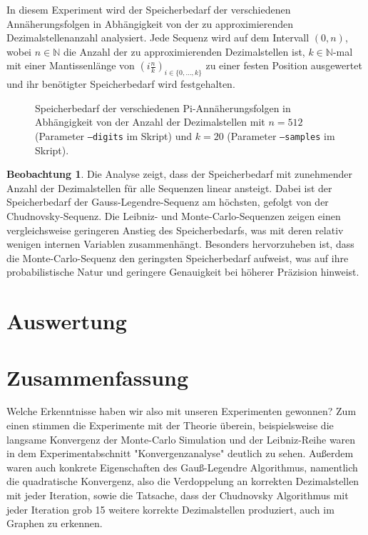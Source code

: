 \documentclass{scrartcl}
\theoremstyle{definition}
\newtheorem{approximation sequence}{Annäherungsfolge}
\newtheorem{observation}{Beobachtung}
\begin{document}
In diesem Experiment wird der Speicherbedarf der verschiedenen
Annäherungsfolgen in Abhängigkeit von der zu approximierenden
Dezimalstellenanzahl analysiert. Jede Sequenz wird auf dem Intervall \((0,
n)\), wobei \(n \in \mathbb{N}\) die Anzahl der zu approximierenden
Dezimalstellen ist, \(k \in \mathbb{N}\)-mal mit einer Mantissenlänge von \(\left(i
\frac{n}{k}\right)_{i \in \{0, \ldots, k\}}\) zu einer festen Position
ausgewertet und ihr benötigter Speicherbedarf wird festgehalten.

\begin{figure}[H]
    \centering
    
    \caption{
        Speicherbedarf der verschiedenen Pi-Annäherungsfolgen in Abhängigkeit
        von der Anzahl der Dezimalstellen mit \(n = 512\) (Parameter
        \texttt{--digits} im Skript) und \(k = 20\) (Parameter
        \texttt{--samples} im Skript).
    }
    \label{fig:memory-usage}
\end{figure}

\begin{observation}
    Die Analyse zeigt, dass der Speicherbedarf mit zunehmender Anzahl der
    Dezimalstellen für alle Sequenzen linear ansteigt. Dabei ist der
    Speicherbedarf der Gauss-Legendre-Sequenz am höchsten, gefolgt von der
    Chudnovsky-Sequenz. Die Leibniz- und Monte-Carlo-Sequenzen zeigen einen
    vergleichsweise geringeren Anstieg des Speicherbedarfs, was mit deren
    relativ wenigen internen Variablen zusammenhängt. Besonders hervorzuheben
    ist, dass die Monte-Carlo-Sequenz den geringsten Speicherbedarf aufweist,
    was auf ihre probabilistische Natur und geringere Genauigkeit bei höherer
    Präzision hinweist.
\end{observation}

\section{Auswertung}

\section{Zusammenfassung}
Welche Erkenntnisse haben wir also mit unseren Experimenten gewonnen? Zum einen stimmen die Experimente mit der Theorie überein, beispielsweise die 
langsame Konvergenz der Monte-Carlo Simulation und der Leibniz-Reihe waren in dem Experimentabschnitt "Konvergenzanalyse" deutlich zu sehen. 
Außerdem waren auch konkrete Eigenschaften des Gauß-Legendre Algorithmus, namentlich die quadratische Konvergenz, also die Verdoppelung an korrekten Dezimalstellen 
mit jeder Iteration, sowie die Tatsache, dass der Chudnovsky Algorithmus mit jeder Iteration grob 15 weitere korrekte Dezimalstellen produziert, auch im Graphen zu erkennen.
\end{document}
